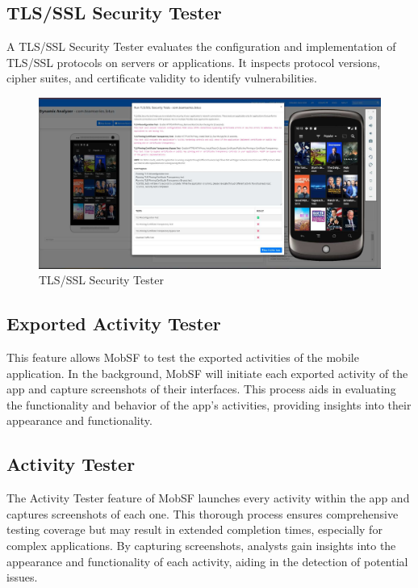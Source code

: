 \documentclass{report}
\begin{document}
\subsection{TLS/SSL Security Tester}
A TLS/SSL Security Tester evaluates the configuration and implementation of TLS/SSL protocols on servers or applications. It inspects protocol versions, cipher suites, and certificate validity to identify vulnerabilities. 
\begin{figure}[hbt!]
    \centering
    \includegraphics[width=1\linewidth]{Dynamic Analyzer/tsl.jpg}
    \caption{TLS/SSL Security Tester}
    \label{fig:example}
\end{figure}
\FloatBarrier

\subsection{Exported Activity Tester}
This feature allows MobSF to test the exported activities of the mobile application. In the background, MobSF will initiate each exported activity of the app and capture screenshots of their interfaces. This process aids in evaluating the functionality and behavior of the app's activities, providing insights into their appearance and functionality.

\subsection{Activity Tester}
The Activity Tester feature of MobSF launches every activity within the app and captures screenshots of each one. This thorough process ensures comprehensive testing coverage but may result in extended completion times, especially for complex applications. By capturing screenshots, analysts gain insights into the appearance and functionality of each activity, aiding in the detection of potential issues. 
\end{document}
